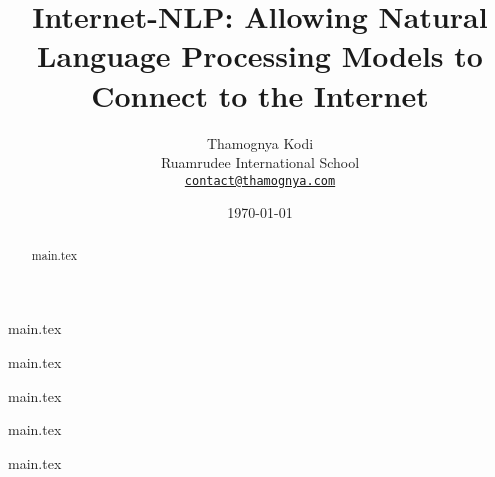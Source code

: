 \documentclass[11pt,a4]{article}
\title{\textbf{Internet-NLP}: Allowing Natural Language Processing Models to Connect to the Internet}
\author{
    Thamognya Kodi \\
    Ruamrudee International School \\
    {\tt \href{mailto:contact@thamognya.com}{contact@thamognya.com}} \\
}
\date{\today}
\begin{document}
\maketitle

\begin{abstract}
    {main.tex}
\end{abstract}

{main.tex}

{main.tex}

{main.tex}

{main.tex}

% 
% 


\appendix
{main.tex}
\end{document}
